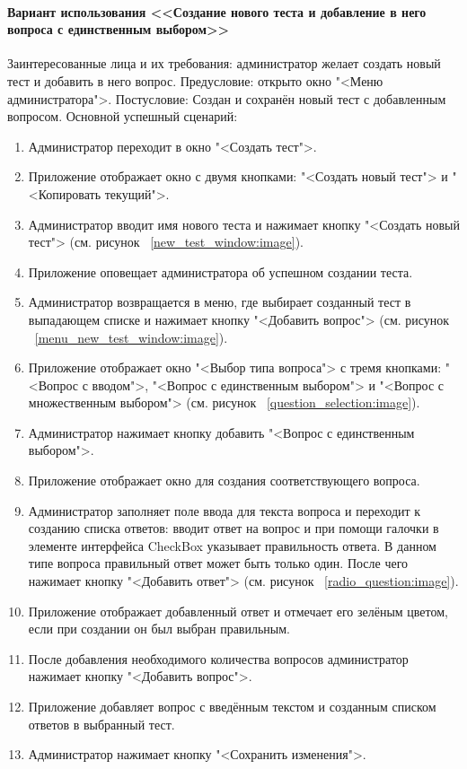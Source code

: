 \paragraph{Вариант использования <<Создание нового теста и добавление в него вопроса с единственным выбором>>}

Заинтересованные лица и их требования: администратор желает создать новый тест и добавить в него вопрос.
\newline Предусловие: открыто окно "<Меню администратора">.
\newline Постусловие: Создан и сохранён новый тест с добавленным вопросом.
\newline Основной успешный сценарий:
\begin{enumerate}
	\item Администратор переходит в окно "<Создать тест">.
	\item Приложение отображает окно с двумя кнопками: "<Создать новый тест"> и "<Копировать текущий">.
	\item Администратор вводит имя нового теста и нажимает кнопку "<Создать новый тест"> (см. рисунок ~\ref{new_test_window:image}).
	\item Приложение оповещает администратора об успешном создании теста. 
	\item Администратор возвращается в меню, где выбирает созданный тест в выпадающем списке и нажимает кнопку "<Добавить вопрос"> (см. рисунок ~\ref{menu_new_test_window:image}).
	\item Приложение отображает окно "<Выбор типа вопроса"> с тремя кнопками: "<Вопрос с вводом">, "<Вопрос с единственным выбором"> и "<Вопрос с множественным выбором"> (см. рисунок ~\ref{question_selection:image}).
	\item Администратор нажимает кнопку добавить "<Вопрос с единственным выбором">.
	\item Приложение отображает окно для создания соответствующего вопроса.
	\item Администратор заполняет поле ввода для текста вопроса и переходит к созданию списка ответов: вводит ответ на вопрос и при помощи галочки в элементе интерфейса CheckBox указывает правильность ответа. В данном типе вопроса правильный ответ может быть только один. После чего нажимает кнопку "<Добавить ответ"> (см. рисунок ~\ref{radio_question:image}).
	\item Приложение отображает добавленный ответ и отмечает его зелёным цветом, если при создании он был выбран правильным.
	\item После добавления необходимого количества вопросов администратор нажимает кнопку "<Добавить вопрос">.
	\item Приложение добавляет вопрос с введённым текстом и созданным списком ответов в выбранный тест.
	\item Администратор нажимает кнопку "<Сохранить изменения">.
\end{enumerate}

